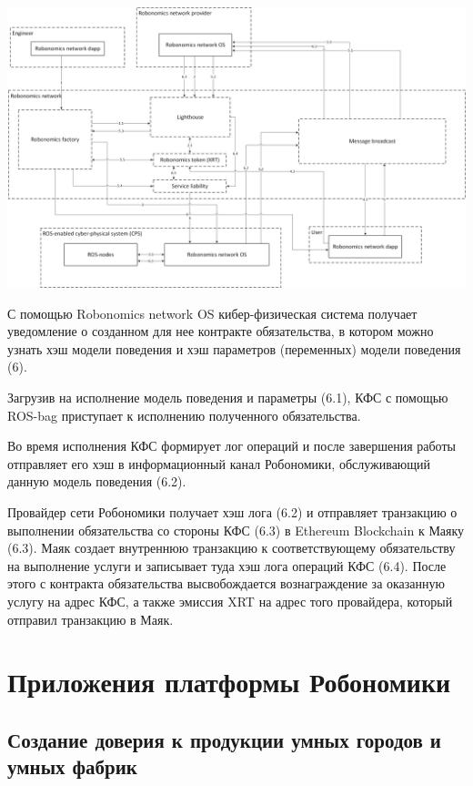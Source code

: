 \documentclass{article}
\begin{document}
\includegraphics[width=1\textwidth]{step-by-step-6.png} 

С помощью Robonomics network OS кибер-физическая система получает уведомление о созданном для нее контракте обязательства, в котором можно узнать хэш модели поведения и хэш параметров (переменных) модели поведения (6). 

Загрузив на исполнение модель поведения и параметры (6.1), КФС с помощью ROS-bag приступает к исполнению полученного обязательства.

Во время исполнения КФС формирует лог операций и после завершения работы отправляет его хэш в информационный канал Робономики, обслуживающий данную модель поведения (6.2).

Провайдер сети Робономики получает хэш лога (6.2) и отправляет транзакцию о выполнении обязательства со стороны КФС (6.3) в Ethereum Blockchain к Маяку (6.3). Маяк создает внутреннюю транзакцию к соответствующему обязательству на выполнение услуги и записывает туда хэш лога операций КФС (6.4). После этого с контракта обязательства высвобождается вознаграждение за оказанную услугу на адрес КФС, а также эмиссия XRT на адрес того провайдера, который отправил транзакцию в Маяк.

\section{Приложения платформы Робономики}

\subsection{Создание доверия к продукции умных городов и умных фабрик}
\end{document}
